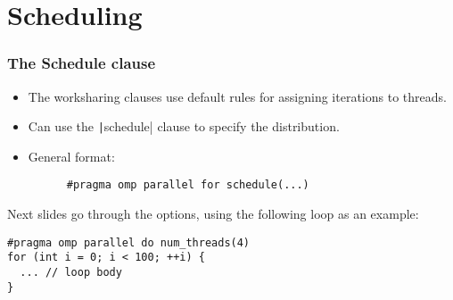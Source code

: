 \documentclass{beamer}
\begin{document}
\section{Scheduling}
\begin{frame}[fragile]
\frametitle{The Schedule clause}
\begin{itemize}
  \item The worksharing clauses use default rules for assigning iterations to threads.
  \item Can use the \texttt|schedule| clause to specify the distribution.
  \item General format:
    \begin{verbatim}
      #pragma omp parallel for schedule(...)
    \end{verbatim}
\end{itemize}
Next slides go through the options, using the following loop as an example:
\begin{verbatim}
#pragma omp parallel do num_threads(4)
for (int i = 0; i < 100; ++i) {
  ... // loop body
}
\end{verbatim}

\end{frame}
\end{document}

